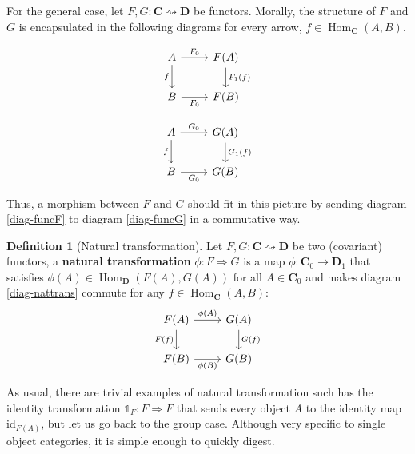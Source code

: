 \documentclass{article}
\theoremstyle{definition}
\newtheorem{defn}[thm]{Definition}
\theoremstyle{remark}
\newcommand{\one}{\mathbb{1}}
\DeclareMathOperator{\Hom}{Hom}
\newcommand{\id}{\text{id}}
\begin{document}
For the general case, let $F,G: \mathbf{C}\rightsquigarrow \mathbf{D}$ be functors. Morally, the structure of $F$ and $G$ is encapsulated in the following diagrams for every arrow, $f \in \Hom_{\mathbf{C}}(A,B)$.
\begin{center}
	
	\begin{minipage}{0.38\textwidth}
		\begin{equation}\label{diag-funcF}
		\begin{tikzcd}
		A \arrow[d, "f"'] \arrow[r, "F_0"] & F(A) \arrow[d, "F_1(f)"] \\
		B \arrow[r, "F_0"']                & F(B)                 
		\end{tikzcd}
		\end{equation}
	\end{minipage}
	\begin{minipage}{0.38\textwidth}
		\begin{equation}\label{diag-funcG}
		\begin{tikzcd}
		A \arrow[d, "f"'] \arrow[r, "G_0"] & G(A) \arrow[d, "G_1(f)"] \\
		B \arrow[r, "G_0"']                & G(B)                 
		\end{tikzcd}
		\end{equation}
	\end{minipage}
\end{center}
Thus, a morphism between $F$ and $G$ should fit in this picture by sending diagram \eqref{diag-funcF} to diagram \eqref{diag-funcG} in a commutative way.
\begin{defn}[Natural transformation]\label{defnattran}
	Let $F,G : \mathbf{C} \rightsquigarrow \mathbf{D}$ be two (covariant) functors, a \textbf{natural transformation} $\phi: F \Rightarrow G$ is a map $\phi: \mathbf{C}_0 \rightarrow \mathbf{D}_1$ that satisfies $\phi(A) \in \Hom_{\mathbf{D}}(F(A), G(A))$ for all $A \in \mathbf{C}_0$ and makes diagram \eqref{diag-nattrans} commute for any $f \in \Hom_{\mathbf{C}}(A,B)$:
	\begin{equation}\label{diag-nattrans}
	\begin{tikzcd}
	F(A) \arrow[d, "F(f)"'] \arrow[r, "\phi(A)"] & G(A) \arrow[d, "G(f)"] \\
	F(B) \arrow[r, "\phi(B)"'] & G(B)
	\end{tikzcd}
	\end{equation}
\end{defn}
As usual, there are trivial examples of natural transformation such has the identity transformation $\one_F:F \Rightarrow F$ that sends every object $A$ to the identity map $\id_{F(A)}$, but let us go back to the group case. Although very specific to single object categories, it is simple enough to quickly digest.
\end{document}
